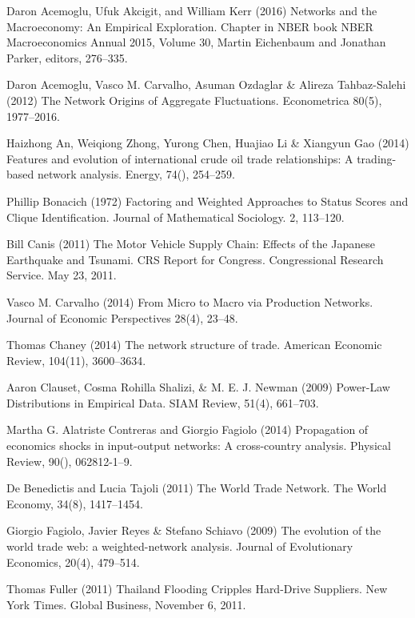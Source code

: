 \documentclass[10pt,letterpaper,pdftex]{article}
\begin{document}
\begin{thebibliography}{99}
Daron Acemoglu, Ufuk Akcigit, and William Kerr (2016)
Networks and the Macroeconomy: An Empirical Exploration. 
Chapter in NBER book NBER Macroeconomics Annual 2015, Volume 30, Martin Eichenbaum and Jonathan Parker, editors, 276--335.

Daron Acemoglu, Vasco M. Carvalho, Asuman Ozdaglar \& Alireza Tahbaz-Salehi (2012) The Network Origins of Aggregate Fluctuations. Econometrica 80(5), 1977--2016.

Haizhong An, Weiqiong Zhong, Yurong Chen, Huajiao Li \& Xiangyun Gao (2014) Features and evolution of international crude oil trade relationships: A trading-based network analysis. Energy, 74(), 254--259. 

Phillip Bonacich (1972) Factoring and Weighted Approaches to Status Scores and Clique Identification. Journal of Mathematical Sociology. 2, 113--120.

Bill Canis (2011) The Motor Vehicle Supply Chain: Effects of the Japanese Earthquake and Tsunami. CRS Report for Congress. Congressional Research Service. May 23, 2011.

Vasco M. Carvalho (2014) From Micro to Macro via Production Networks. Journal of Economic Perspectives 28(4), 23--48.

Thomas Chaney (2014) The network structure of trade. American Economic Review, 104(11), 3600--3634.

Aaron Clauset, Cosma Rohilla Shalizi, \& M. E. J. Newman (2009) Power-Law Distributions in Empirical Data. SIAM Review, 51(4), 661--703.

Martha G. Alatriste Contreras and Giorgio Fagiolo (2014) Propagation of economics shocks in input-output networks: A cross-country analysis. Physical Review, 90(), 062812-1--9. 

De Benedictis and Lucia Tajoli (2011) The World Trade Network. The World Economy, 34(8), 1417--1454.  

Giorgio Fagiolo, Javier Reyes \& Stefano Schiavo (2009) The evolution of the world trade web: a weighted-network analysis. Journal of Evolutionary Economics, 20(4), 479--514.

Thomas Fuller (2011) Thailand Flooding Cripples Hard-Drive Suppliers. New York Times. Global Business, November 6, 2011.


\end{thebibliography}
\end{document}
